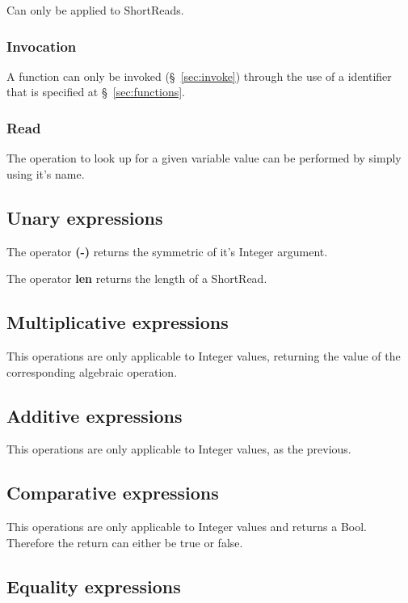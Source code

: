 \documentclass{article}
\begin{document}
\noindent
Can only be applied to ShortReads.

\subsubsection{Invocation}

A function can only be invoked (§~\ref{sec:invoke}) through the use of a identifier that is specified at §~\ref{sec:functions}.

\subsubsection{Read}

The operation to look up for a given variable value can be performed by simply using it's name.

\subsection{Unary expressions}

The operator \textbf{(-)} returns the symmetric of it's Integer argument.

\noindent
The operator \textbf{len} returns the length of a ShortRead.


\subsection{Multiplicative expressions}

This operations are only applicable to Integer values, returning the value of the corresponding algebraic operation.


\subsection{Additive expressions}

This operations are only applicable to Integer values, as the previous.


\subsection{Comparative expressions}

This operations are only applicable to Integer values and returns a Bool. Therefore the return can either be true or false.

\subsection{Equality expressions}
\end{document}
